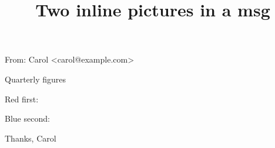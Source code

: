 \documentclass[11pt,a4paper]{article}
\title{Two inline pictures in a msg}
\begin{document}
\maketitle

From: Carol <carol@example.com>

Quarterly figures

Red first:

Blue second:

Thanks, Carol
\end{document}
